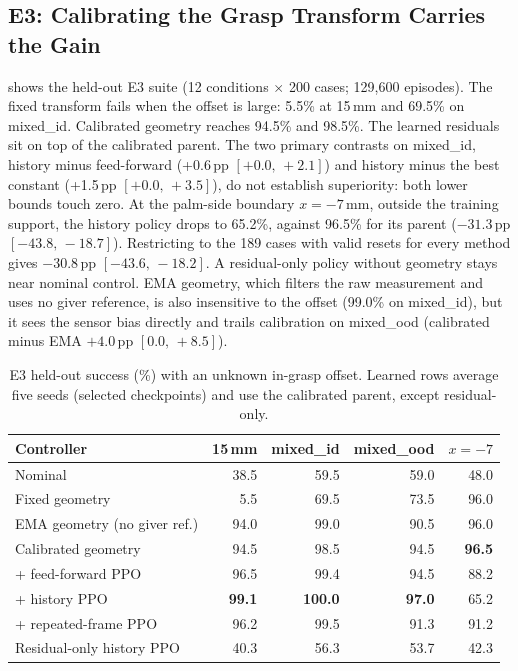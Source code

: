 \documentclass[conference,letterpaper]{IEEEtran}
\newcommand{\pp}{\,pp}
\newcommand{\ci}[2]{\mbox{$[#1,\,#2]$}}
\newcommand{\cond}[1]{\textsf{\small #1}}
\begin{document}
\subsection{E3: Calibrating the Grasp Transform Carries the Gain}

 shows the held-out E3 suite (12 conditions $\times$ 200 cases; 129,600 episodes). The fixed transform
fails when the offset is large: 5.5\% at 15\,mm and 69.5\% on \cond{mixed\_id}. Calibrated geometry reaches 94.5\%
and 98.5\%. The learned residuals sit on top of the calibrated parent. The two primary contrasts on
\cond{mixed\_id}, history minus feed-forward (+0.6\pp{} \ci{+0.0}{+2.1}) and history minus the best constant
(+1.5\pp{} \ci{+0.0}{+3.5}), do not establish superiority: both lower bounds touch zero. At the palm-side boundary
$x=-7$\,mm, outside the training support, the history policy drops to 65.2\%, against 96.5\% for its parent
($-31.3$\pp{} \ci{-43.8}{-18.7}). Restricting to the 189 cases with valid resets for every method gives
$-30.8$\pp{} \ci{-43.6}{-18.2}. A residual-only policy without geometry stays near nominal control. EMA geometry, which filters the raw
measurement and uses no giver reference, is also insensitive to the offset (99.0\% on \cond{mixed\_id}), but it
sees the sensor bias directly and trails calibration on \cond{mixed\_ood} (calibrated minus EMA $+4.0$\pp{}
\ci{0.0}{+8.5}).

\begin{table}[t]
\centering
\caption{E3 held-out success (\%) with an unknown in-grasp offset. Learned rows average five seeds (selected
checkpoints) and use the calibrated parent, except residual-only.}
\label{tab:e3}
\setlength{\tabcolsep}{3.7pt}
\begin{tabular}{@{}lrrrr@{}}
\toprule
Controller & 15\,mm & \cond{mixed\_id} & \cond{mixed\_ood} & $x{=}{-}7$ \\
\midrule
Nominal & 38.5 & 59.5 & 59.0 & 48.0 \\
Fixed geometry & 5.5 & 69.5 & 73.5 & 96.0 \\
EMA geometry (no giver ref.) & 94.0 & 99.0 & 90.5 & 96.0 \\
Calibrated geometry & 94.5 & 98.5 & 94.5 & \textbf{96.5} \\
\quad + feed-forward PPO & 96.5 & 99.4 & 94.5 & 88.2 \\
\quad + history PPO & \textbf{99.1} & \textbf{100.0} & \textbf{97.0} & 65.2 \\
\quad + repeated-frame PPO & 96.2 & 99.5 & 91.3 & 91.2 \\
Residual-only history PPO & 40.3 & 56.3 & 53.7 & 42.3 \\
\bottomrule
\end{tabular}
\end{table}
\end{document}
